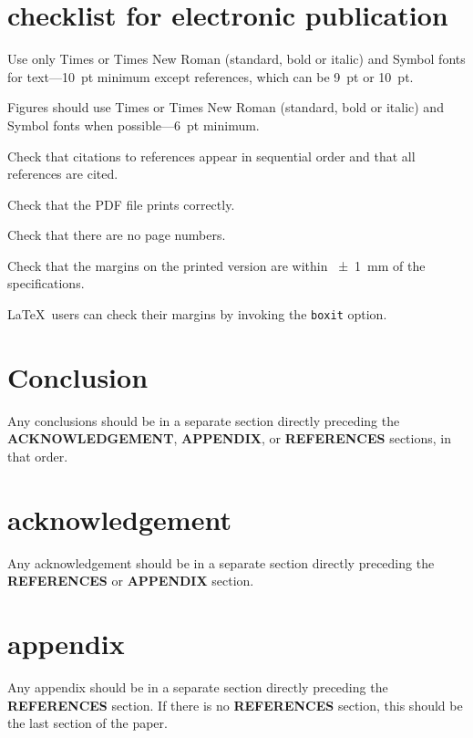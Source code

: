 \documentclass[a4paper,
              ]{jacow}
\newcommand\SEC[1]{\textbf{\uppercase{#1}}}
\begin{document}
\section{checklist for electronic publication}

\begin{Itemize}
	\item  Use only Times or Times New Roman (standard, bold or italic) and Symbol
	fonts for text---\SI{10}{pt} minimum except references, which can be \SI{9}{pt} or \SI{10}{pt}.
	\item  Figures should use Times or Times New Roman (standard, bold or italic) and
	Symbol fonts when possible---\SI{6}{pt} minimum.
	\item  Check that citations to references appear in sequential order and
	that all references are cited.
	\item  Check that the PDF file prints correctly.
	\item  Check that there are no page numbers.
	\item  Check that the margins on the printed version are within \SI{\pm1}{mm}
	of the specifications.
	\item  \LaTeX\ users can check their margins by invoking the
	\texttt{boxit} option.
\end{Itemize}

\raggedend
\newpage

\section{Conclusion}

Any conclusions should be in a separate section directly preceding
the \SEC{Acknowledgement}, \SEC{Appendix}, or \SEC{References} sections, in that
order.

\section{acknowledgement}
Any acknowledgement should be in a separate section directly preceding
the \SEC{References} or \SEC{Appendix} section.


\section{appendix}
Any appendix should be in a separate section directly preceding
the \SEC{References} section. If there is no \SEC{References} section,
this should be the last section of the paper.
\end{document}
